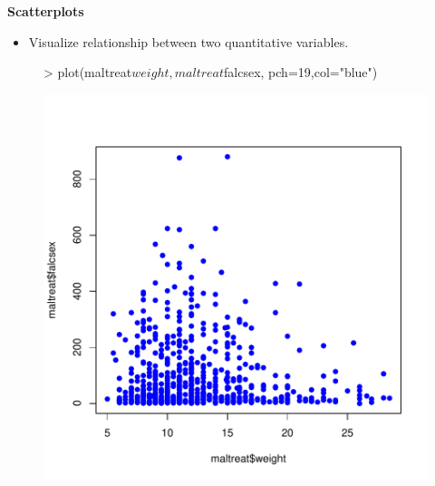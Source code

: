 \documentclass[xcolor=dvipsnames , 11pt]{beamer}
\begin{document}
\begin{frame}[fragile]{\textbf{Scatterplots}}
\begin{itemize}
\item Visualize relationship between two quantitative variables.\vspace{0.3cm}
\end{itemize}
\begin{center}
\begin{figure}
\centering
\begin{Schunk}
\begin{Sinput}
> plot(maltreat$weight,maltreat$falcsex, pch=19,col="blue")
\end{Sinput}
\end{Schunk}
\includegraphics{lesson_graphs_presentation-005}
\end{figure}
\end{center}



\end{frame}
\end{document}
